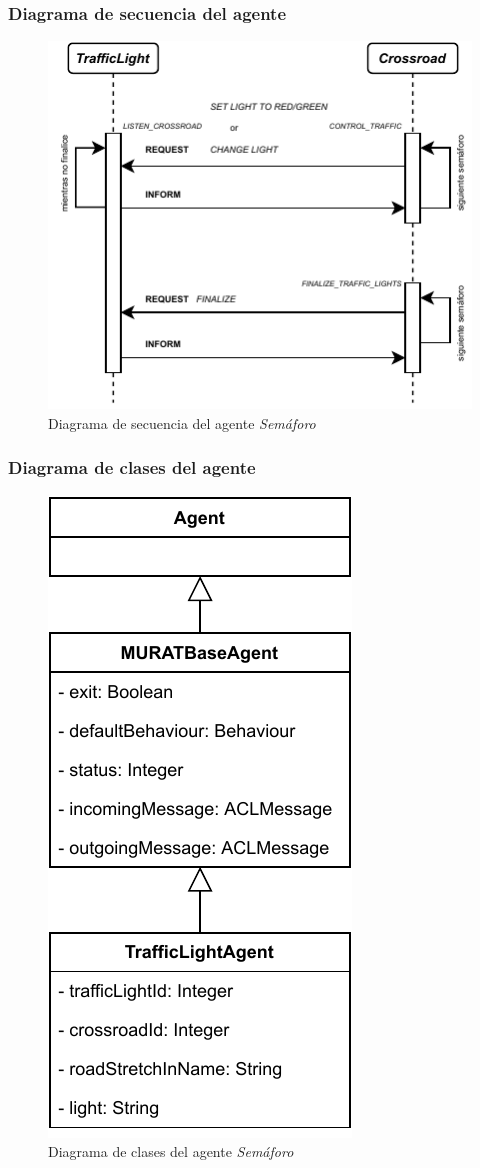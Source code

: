 \subsubsection{Diagrama de secuencia del agente}
\begin{figure}[H]
    \centering
    \includegraphics[width=1\linewidth]{text/image/DAgen-DS-TrafficLight.pdf}
    \caption{Diagrama de secuencia del agente \textit{Semáforo}}
    \label{fig:ds_agente_semaforo}
\end{figure}

\subsubsection{Diagrama de clases del agente}
\begin{figure}[H]
    \centering
    \includegraphics[width=0.35\linewidth]{text/image/DAgen-DC-TrafficLight.pdf}
    \caption{Diagrama de clases del agente \textit{Semáforo}}
    \label{fig:dc_agente_semaforo}
\end{figure}

